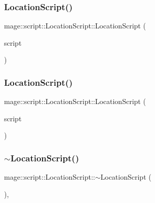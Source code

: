 \subsubsection{\texorpdfstring{Location\+Script()}{LocationScript()}\hspace{0.1cm}{\footnotesize\ttfamily [2/3]}}
{\footnotesize\ttfamily mage\+::script\+::\+Location\+Script\+::\+Location\+Script (\begin{DoxyParamCaption}\item[{const \hyperlink{classmage_1_1script_1_1_location_script}{Location\+Script} \&}]{script }\end{DoxyParamCaption})\hspace{0.3cm}{\ttfamily [delete]}}

\hypertarget{classmage_1_1script_1_1_location_script_aa8438383d00de95deb585ac7d7349dfb}{}\label{classmage_1_1script_1_1_location_script_aa8438383d00de95deb585ac7d7349dfb} 
\subsubsection{\texorpdfstring{Location\+Script()}{LocationScript()}\hspace{0.1cm}{\footnotesize\ttfamily [3/3]}}
{\footnotesize\ttfamily mage\+::script\+::\+Location\+Script\+::\+Location\+Script (\begin{DoxyParamCaption}\item[{\hyperlink{classmage_1_1script_1_1_location_script}{Location\+Script} \&\&}]{script }\end{DoxyParamCaption})\hspace{0.3cm}{\ttfamily [default]}}

\hypertarget{classmage_1_1script_1_1_location_script_aa75c1d8f101670ff8be77595a9c073bb}{}\label{classmage_1_1script_1_1_location_script_aa75c1d8f101670ff8be77595a9c073bb} 
\subsubsection{\texorpdfstring{$\sim$\+Location\+Script()}{~LocationScript()}}
{\footnotesize\ttfamily mage\+::script\+::\+Location\+Script\+::$\sim$\+Location\+Script (\begin{DoxyParamCaption}{ }\end{DoxyParamCaption})\hspace{0.3cm}{\ttfamily [virtual]}, {\ttfamily [default]}}



